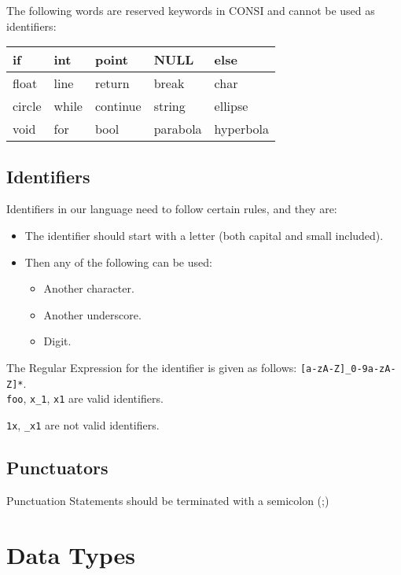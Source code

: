 \documentclass[12pt]{fphw}
\begin{document}
The following words are reserved keywords in CONSI and cannot be used as identifiers:

\begin{center}
\begin{tabular}{|l|l|l|l|l|}
\hline
if & int & point & NULL & else \\
\hline
float & line & return & break & char \\
\hline
circle & while & continue & string & ellipse \\
\hline
void & for & bool & parabola & hyperbola \\
\hline
\end{tabular}
\end{center}

\subsection{Identifiers}

Identifiers in our language need to follow certain rules, and they are:
\begin{itemize}
    \item The identifier should start with a letter (both capital and small included).
    \item Then any of the following can be used:
    \begin{itemize}
        \item Another character.
        \item Another underscore.
        \item Digit.
    \end{itemize}
\end{itemize}

The Regular Expression for the identifier is given as follows: \texttt{[a-zA-Z]\_0-9a-zA-Z]*}.\\

\texttt{foo}, \texttt{x\_1}, \texttt{x1} are valid identifiers.

\texttt{1x}, \texttt{\_x1} are not valid identifiers.


\subsection{Punctuators}
Punctuation Statements should be terminated with a semicolon (;)

\section{Data Types}
\end{document}
